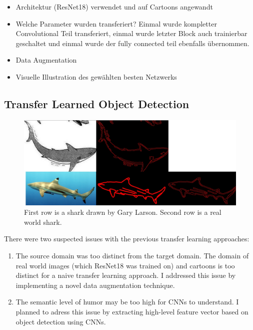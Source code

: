\documentclass[draft,final,oneside]{vutinfth} %
\begin{document}
\begin{itemize}
\item Architektur (ResNet18) verwendet und auf Cartoons angewandt
\item Welche Parameter wurden transferiert? Einmal wurde kompletter Convolutional Teil transferiert, einmal wurde letzter Block auch trainierbar geschaltet und einmal wurde der fully connected teil ebenfalls übernommen.
\item Data Augmentation
\item Visuelle Illustration des gewählten besten Netzwerks

\end{itemize}
\fi


\subsection{Transfer Learned Object Detection}

\begin{figure}[ht]
	\centering
  	\includegraphics[width=1.0\textwidth]{graphics/edge_edge_detection.jpg}
	\caption{First row is a shark drawn by Gary Larson. Second row is a real world shark.}
	\label{fig:dataugmentation}
\end{figure}

There were two suspected issues with the previous transfer learning approaches:

\begin{enumerate}
\item The source domain was too distinct from the target domain. The domain of real world images (which ResNet18 was trained on) and cartoons is too distinct for a naive transfer learning approach. I addressed this issue by implementing a novel data augmentation technique.
\item The semantic level of humor may be too high for CNNs to understand. I planned to adress this issue by extracting high-level feature vector based on object detection using CNNs.
\end{enumerate}
\end{document}
